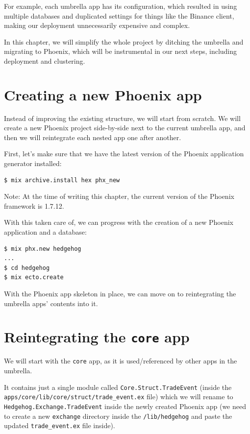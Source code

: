 \documentclass[
  oneside]{book}
\begin{document}
For example, each umbrella app has its configuration, which resulted in using multiple databases and duplicated settings for things like the Binance client, making our deployment unnecessarily expensive and complex.

In this chapter, we will simplify the whole project by ditching the umbrella and migrating to Phoenix, which will be instrumental in our next steps, including deployment and clustering.

\section{Creating a new Phoenix app}\label{creating-a-new-phoenix-app}

Instead of improving the existing structure, we will start from scratch. We will create a new Phoenix project side-by-side next to the current umbrella app, and then we will reintegrate each nested app one after another.

First, let's make sure that we have the latest version of the Phoenix application generator installed:

\begin{verbatim}
$ mix archive.install hex phx_new
\end{verbatim}

Note: At the time of writing this chapter, the current version of the Phoenix framework is 1.7.12.

With this taken care of, we can progress with the creation of a new Phoenix application and a database:

\begin{verbatim}
$ mix phx.new hedgehog
...
$ cd hedgehog
$ mix ecto.create
\end{verbatim}

With the Phoenix app skeleton in place, we can move on to reintegrating the umbrella apps' contents into it.

\section{\texorpdfstring{Reintegrating the \texttt{core} app}{Reintegrating the core app}}\label{reintegrating-the-core-app}

We will start with the \texttt{core} app, as it is used/referenced by other apps in the umbrella.

It contains just a single module called \texttt{Core.Struct.TradeEvent} (inside the \texttt{apps/core/lib/core/struct/trade\_event.ex} file) which we will rename to \texttt{Hedgehog.Exchange.TradeEvent} inside the newly created Phoenix app (we need to create a new \texttt{exchange} directory inside the \texttt{/lib/hedgehog} and paste the updated \texttt{trade\_event.ex} file inside).
\end{document}
